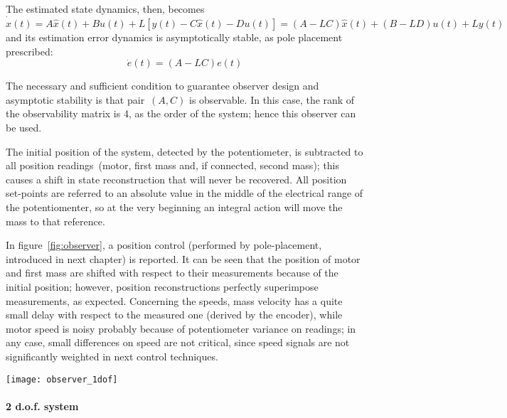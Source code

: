 The estimated state dynamics, then, becomes
\begin{equation}
	\dot{\hat{x}}(t) = A\hat{x}(t) + Bu(t) + L [y(t) - C\hat{x}(t) - Du(t)] = (A-LC)\hat{x}(t) + (B-LD)u(t) + Ly(t)
\end{equation}
and its estimation error dynamics is asymptotically stable, as pole placement prescribed:
\begin{equation}
	\dot{e}(t) = (A-LC){e}(t)
\end{equation}

The necessary and sufficient condition to guarantee observer design and asymptotic stability is that pair~$(A,C)$ is observable. In this case, the rank of the observability matrix is 4, as the order of the system; hence this observer can be used.

The initial position of the system, detected by the potentiometer, is subtracted to all position readings~(motor, first mass and, if connected, second mass); this causes a shift in state reconstruction that will never be recovered. All position set-points are referred to an absolute value in the middle of the electrical range of the potentiomenter, so at the very beginning an integral action will move the mass to that reference.

In figure~\ref{fig:observer}, a position control (performed by pole-placement, introduced in next chapter) is reported. It can be seen that the position of motor and first mass are shifted with respect to their measurements because of the initial position; however, position reconstructions perfectly superimpose measurements, as expected. Concerning the speeds, mass velocity has a quite small delay with respect to the measured one (derived by the encoder), while motor speed is noisy probably because of potentiometer variance on readings; in any case, small differences on speed are not critical, since speed signals are not significantly weighted in next control techniques.
\begin{figure*}[h]
	\centering
	\texttt{[image: observer\_1dof]}
	\caption{Observer reconstruction compared with available measurements}
	\label{fig:observer}
\end{figure*}

\paragraph{2 d.o.f. system}

